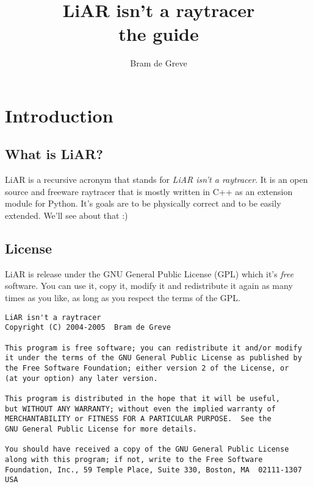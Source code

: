 \documentclass[10pt,a4paper,titlepage,english]{report}
\begin{document}
\title{LiAR isn't a raytracer\\the guide}
\author{Bram de Greve}



\maketitle

\tableofcontents

\chapter{Introduction}

\section{What is LiAR?}

LiAR is a recursive acronym that stands for \emph{LiAR isn't a raytracer}.  It is an open source and freeware raytracer that is mostly written in C++ as an extension module for Python.  
It's goals are to be physically correct and to be easily extended.  We'll see about that :)


\section{License}

LiAR is release under the GNU General Public License (GPL) which it's \emph{free} software.  You can use it, copy it, modify it and redistribute it again as many times as you like, as long as you respect the terms of the GPL.

\begin{verbatim}
LiAR isn't a raytracer
Copyright (C) 2004-2005  Bram de Greve

This program is free software; you can redistribute it and/or modify
it under the terms of the GNU General Public License as published by
the Free Software Foundation; either version 2 of the License, or
(at your option) any later version.

This program is distributed in the hope that it will be useful,
but WITHOUT ANY WARRANTY; without even the implied warranty of
MERCHANTABILITY or FITNESS FOR A PARTICULAR PURPOSE.  See the
GNU General Public License for more details.

You should have received a copy of the GNU General Public License
along with this program; if not, write to the Free Software
Foundation, Inc., 59 Temple Place, Suite 330, Boston, MA  02111-1307  USA
\end{verbatim}
\end{document}
